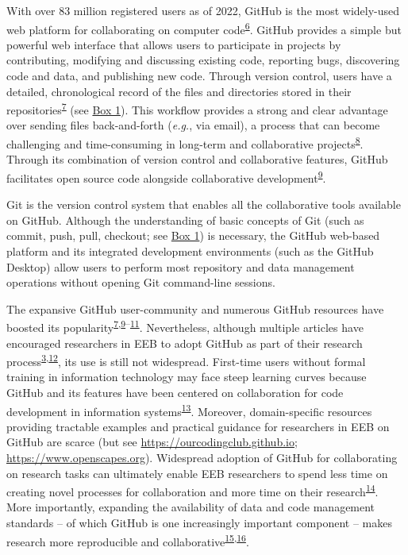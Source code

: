 With over 83 million registered users as of 2022, GitHub is the most widely-used web platform for collaborating on computer code\textsuperscript{\protect\hyperlink{ref-nwCtHDCn}{6}}.
GitHub provides a simple but powerful web interface that allows users to participate in projects by contributing, modifying and discussing existing code, reporting bugs, discovering code and data, and publishing new code.
Through version control, users have a detailed, chronological record of the files and directories stored in their repositories\textsuperscript{\protect\hyperlink{ref-RVetqmsg}{7}} (see \protect\hyperlink{definitions}{Box 1}).
This workflow provides a strong and clear advantage over sending files back-and-forth (\emph{e.g.}, via email), a process that can become challenging and time-consuming in long-term and collaborative projects\textsuperscript{\protect\hyperlink{ref-4ny1onB0}{8}}.
Through its combination of version control and collaborative features, GitHub facilitates open source code alongside collaborative development\textsuperscript{\protect\hyperlink{ref-kEX5dgzK}{9}}.

Git is the version control system that enables all the collaborative tools available on GitHub.
Although the understanding of basic concepts of Git (such as commit, push, pull, checkout; see \protect\hyperlink{definitions}{Box 1}) is necessary, the GitHub web-based platform and its integrated development environments (such as the GitHub Desktop) allow users to perform most repository and data management operations without opening Git command-line sessions.

The expansive GitHub user-community and numerous GitHub resources have boosted its popularity\textsuperscript{\protect\hyperlink{ref-RVetqmsg}{7},\protect\hyperlink{ref-kEX5dgzK}{9}--\protect\hyperlink{ref-u5aEVE4B}{11}}.
Nevertheless, although multiple articles have encouraged researchers in EEB to adopt GitHub as part of their research process\textsuperscript{\protect\hyperlink{ref-10ghgV3S8}{3},\protect\hyperlink{ref-3DKwn1sY}{12}}, its use is still not widespread.
First-time users without formal training in information technology may face steep learning curves because GitHub and its features have been centered on collaboration for code development in information systems\textsuperscript{\protect\hyperlink{ref-139b0pSGc}{13}}.
Moreover, domain-specific resources providing tractable examples and practical guidance for researchers in EEB on GitHub are scarce (but see \url{https://ourcodingclub.github.io}; \url{https://www.openscapes.org}).
Widespread adoption of GitHub for collaborating on research tasks can ultimately enable EEB researchers to spend less time on creating novel processes for collaboration and more time on their research\textsuperscript{\protect\hyperlink{ref-ydrk01SR}{14}}.
More importantly, expanding the availability of data and code management standards -- of which GitHub is one increasingly important component -- makes research more reproducible and collaborative\textsuperscript{\protect\hyperlink{ref-13QX8XU3J}{15},\protect\hyperlink{ref-pq2Tv1BC}{16}}.

